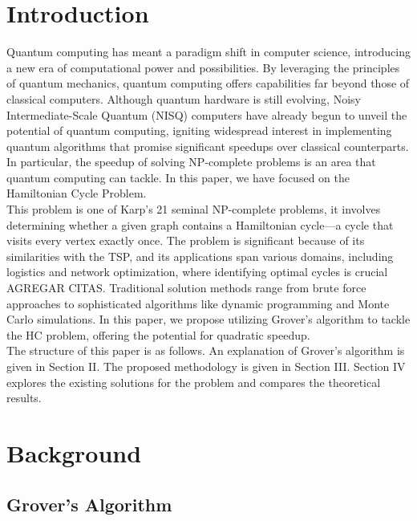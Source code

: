 \documentclass[10pt,a4paper]{article}
\begin{document}
\section{Introduction}

Quantum computing has meant a paradigm shift in computer science, introducing a new era of computational power and possibilities. By leveraging the principles of quantum mechanics, quantum computing offers capabilities far beyond those of classical computers. Although quantum hardware is still evolving, Noisy Intermediate-Scale Quantum (NISQ) \cite{Preskill} computers have already begun to unveil the potential of quantum computing, igniting widespread interest in implementing quantum algorithms that promise significant speedups over classical counterparts. In particular, the speedup of solving NP-complete problems is an area that quantum computing can tackle. In this paper, we have focused on the Hamiltonian Cycle Problem.\\
This problem is one of Karp's 21 seminal NP-complete problems, it involves determining whether a given graph contains a Hamiltonian cycle—a cycle that visits every vertex exactly once. The problem is significant because of its similarities with the TSP, and its applications span various domains, including logistics and network optimization, where identifying optimal cycles is crucial AGREGAR CITAS. Traditional solution methods range from brute force approaches to sophisticated algorithms like dynamic programming and Monte Carlo simulations. In this paper, we propose utilizing Grover's algorithm to tackle the HC problem, offering the potential for quadratic speedup.\\
The structure of this paper is as follows. An explanation of Grover's algorithm is given in Section II. The proposed methodology is given in Section III. Section IV explores the existing solutions for the problem and compares the theoretical results.


\section{Background}
\subsection{Grover's Algorithm}
\end{document}
